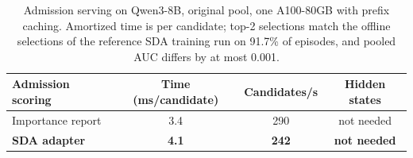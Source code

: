 \begin{table}[t]
\centering
\caption{Admission serving on Qwen3-8B, original pool, one A100-80GB with prefix
caching. Amortized time is per candidate; top-2 selections match the
offline selections of the reference SDA training run on 91.7\%
of episodes, and pooled AUC differs by at most 0.001.}
\label{tab:sdadeploy}
\small
\setlength{\tabcolsep}{4pt}
\begin{tabular}{lccc}
\toprule
Admission scoring & Time (ms/candidate) & Candidates/s & Hidden states \\
\midrule
Importance report & 3.4 & 290 & not needed \\
\textbf{SDA adapter} & \textbf{4.1} & \textbf{242} & \textbf{not needed} \\
\bottomrule
\end{tabular}

\end{table}
